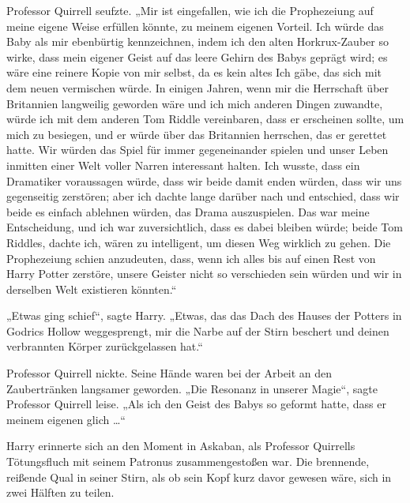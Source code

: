 Professor Quirrell seufzte.
„Mir ist eingefallen, wie ich die Prophezeiung auf meine eigene Weise erfüllen könnte, zu meinem eigenen Vorteil. Ich würde das Baby als mir ebenbürtig kennzeichnen, indem ich den alten Horkrux-Zauber so wirke, dass mein eigener Geist auf das leere Gehirn des Babys geprägt wird; es wäre eine reinere Kopie von mir selbst, da es kein altes Ich gäbe, das sich mit dem neuen vermischen würde. In einigen Jahren, wenn mir die Herrschaft über Britannien langweilig geworden wäre und ich mich anderen Dingen zuwandte, würde ich mit dem anderen Tom Riddle vereinbaren, dass er erscheinen sollte, um mich zu besiegen, und er würde über das Britannien herrschen, das er gerettet hatte. Wir würden das Spiel für immer gegeneinander spielen und unser Leben inmitten einer Welt voller Narren interessant halten. Ich wusste, dass ein Dramatiker voraussagen würde, dass wir beide damit enden würden, dass wir uns gegenseitig zerstören; aber ich dachte lange darüber nach und entschied, dass wir beide es einfach ablehnen würden, das Drama auszuspielen. Das war meine Entscheidung, und ich war zuversichtlich, dass es dabei bleiben würde; beide Tom Riddles, dachte ich, wären zu intelligent, um diesen Weg wirklich zu gehen. Die Prophezeiung schien anzudeuten, dass, wenn ich alles bis auf einen Rest von Harry Potter zerstöre, unsere Geister nicht so verschieden sein würden und wir in derselben Welt existieren könnten.“

„Etwas ging schief“, sagte Harry.
„Etwas, das das Dach des Hauses der Potters in Godrics Hollow weggesprengt, mir die Narbe auf der Stirn beschert und deinen verbrannten Körper zurückgelassen hat.“

Professor Quirrell nickte. Seine Hände waren bei der Arbeit an den Zaubertränken langsamer geworden.
„Die Resonanz in unserer Magie“, sagte Professor Quirrell leise.
„Als ich den Geist des Babys so geformt hatte, dass er meinem eigenen glich …“

Harry erinnerte sich an den Moment in Askaban, als Professor Quirrells Tötungsfluch mit seinem Patronus zusammengestoßen war. Die brennende, reißende Qual in seiner Stirn, als ob sein Kopf kurz davor gewesen wäre, sich in zwei Hälften zu teilen.

